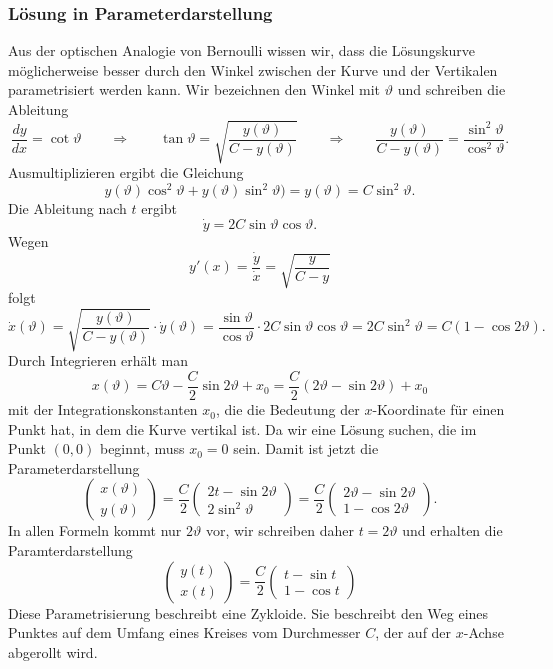 %
%
\subsubsection{Lösung in Parameterdarstellung}
Aus der optischen Analogie von Bernoulli wissen wir, dass die Lösungskurve
möglicherweise besser durch den Winkel zwischen der Kurve und der Vertikalen
parametrisiert werden kann.
Wir bezeichnen den Winkel mit $\vartheta$ und schreiben die Ableitung
\[
\frac{dy}{dx}
=
\cot \vartheta
\qquad\Rightarrow\qquad
\tan \vartheta
=
\sqrt{\frac{y(\vartheta)}{C-y(\vartheta)}}
\qquad\Rightarrow\qquad
\frac{y(\vartheta)}{C-y(\vartheta)}
=
\frac{\sin^2 \vartheta}{\cos^2 \vartheta}.
\]
Ausmultiplizieren ergibt die Gleichung
\[
y(\vartheta)\cos^2\vartheta +y(\vartheta)\sin^2\vartheta) = y(\vartheta) = C\sin^2\vartheta.
\]
Die Ableitung nach $t$ ergibt
\[
\dot{y}
=
2C\sin \vartheta\cos \vartheta.
\]
Wegen
\[
y'(x)
=
\frac{\dot{y}}{\dot{x}}
=
\sqrt{ \frac{y}{C-y}}
\]
folgt
\[
\dot{x}(\vartheta)
=
\sqrt{\frac{y(\vartheta)}{C-y(\vartheta)}}
\cdot\dot{y}(\vartheta)
=
\frac{\sin \vartheta}{\cos \vartheta}\cdot 2 C\sin \vartheta\cos \vartheta
=
2C\sin^2\vartheta
=
C(1-\cos 2\vartheta).
\]
Durch Integrieren erhält man
\[
x(\vartheta)
= 
C\vartheta - \frac{C}{2}\sin 2\vartheta
+ x_0
=
\frac{C}2(2\vartheta-\sin 2\vartheta)+x_0
\]
mit der Integrationskonstanten $x_0$, die die Bedeutung der $x$-Koordinate
für einen Punkt hat, in dem die Kurve vertikal ist.
Da wir eine Lösung suchen, die im Punkt $(0,0)$ beginnt, muss $x_0=0$ sein.
Damit ist jetzt die Parameterdarstellung
\[
\begin{pmatrix}
x(\vartheta)\\
y(\vartheta)
\end{pmatrix}
=
\frac{C}{2}
\begin{pmatrix}
2t - \sin 2\vartheta\\
2\sin^2 \vartheta
\end{pmatrix}
=
\frac{C}{2}
\begin{pmatrix}
2\vartheta - \sin 2\vartheta\\
1  - \cos 2\vartheta
\end{pmatrix}.
\]
In allen Formeln kommt nur $2\vartheta$ vor, wir schreiben daher
$t=2\vartheta$ und erhalten die Paramterdarstellung
\begin{equation}
\begin{pmatrix}
y(t)\\
x(t)
\end{pmatrix}
=
\frac{C}{2}
\begin{pmatrix}
t-\sin t\\
1-\cos t
\end{pmatrix}
\label{buch:variation:eulerlagrange:eqn:zykloide}
\end{equation}
Diese Parametrisierung beschreibt eine Zykloide.
Sie beschreibt den Weg eines Punktes auf dem Umfang eines Kreises
vom Durchmesser $C$, der auf der $x$-Achse abgerollt wird.

